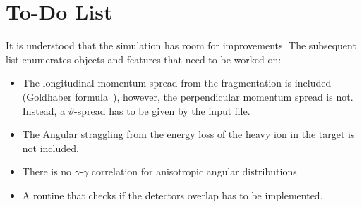 \documentclass[12pt]{book}
\begin{document}
\chapter{To-Do List}

It is understood that the simulation has room for improvements. The subsequent list enumerates objects
and features that need to be worked on:

\begin{itemize}

\item The longitudinal momentum spread from the fragmentation is included (Goldhaber formula~\cite{GOLDHABER}), however,
the perpendicular momentum spread is not. Instead, a $\vartheta$-spread has to be given by the input file.
\item The Angular straggling from the energy loss of the heavy ion in the target is not included.
\item There is no $\gamma$-$\gamma$ correlation for anisotropic angular distributions
\item A routine that checks if the detectors overlap has to be implemented.
\end{itemize}
  
  

\end{document}
